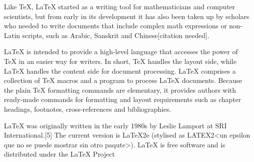 Like TeX, LaTeX started as a writing tool for mathematicians and computer scientists, but from early in its development it has also been taken up by scholars who needed to write documents that include complex math expressions or non-Latin scripts, such as Arabic, Sanskrit and Chinese[citation needed].

LaTeX is intended to provide a high-level language that accesses the power of TeX in an easier way for writers. In short, TeX handles the layout side, while LaTeX handles the content side for document processing. LaTeX comprises a collection of TeX macros and a program to process LaTeX documents. Because the plain TeX formatting commands are elementary, it provides authors with ready-made commands for formatting and layout requirements such as chapter headings, footnotes, cross-references and bibliographies.

LaTeX was originally written in the early 1980s by Leslie Lamport at SRI International.[5] The current version is LaTeX2e (stylised as LATEX2<un epsilon que no se puede mostrar sin otro paqute>). LaTeX is free software and is distributed under the LaTeX Project
